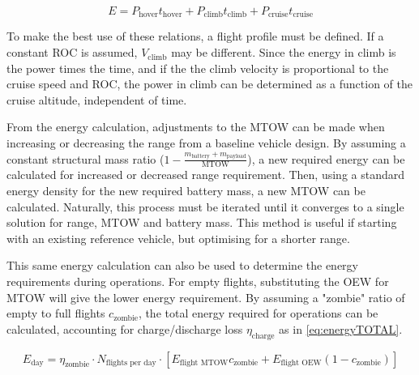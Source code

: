 \begin{equation}
    \label{eq:energy}
    E = P_\text{hover}t_\text{hover} + P_\text{climb}t_\text{climb} + P_\text{cruise}t_\text{cruise}
\end{equation}

To make the best use of these relations, a flight profile must be defined. If a constant ROC is assumed, $V_\text{climb}$ may be different. Since the energy in climb is the power times the time, and if the the climb velocity is proportional to the cruise speed and ROC, the power in climb can be determined as a function of the cruise altitude, independent of time.

From the energy calculation, adjustments to the MTOW can be made when increasing or decreasing the range from a baseline vehicle design. By assuming a constant structural mass ratio ($1-\frac{m_\text{battery}+m_\text{payload}}{\text{MTOW}}$), a new required energy can be calculated for increased or decreased range requirement. Then, using a standard energy density for the new required battery mass, a new MTOW can be calculated. Naturally, this process must be iterated until it converges to a single solution for range, MTOW and battery mass. This method is useful if starting with an existing reference vehicle, but optimising for a shorter range.

This same energy calculation can also be used to determine the energy requirements during operations. For empty flights, substituting the OEW for MTOW will give the lower energy requirement. By assuming a "zombie" ratio of empty to full flights $c_\text{zombie}$, the total energy required for operations can be calculated, accounting for charge/discharge loss $\eta_\text{charge}$ as in \autoref{eq:energyTOTAL}.

\begin{equation}
    \label{eq:energyTOTAL}
    E_\text{day} = \eta_\text{zombie}\cdot N_\text{flights per day} \cdot \left[ E_\text{flight MTOW}c_\text{zombie} + E_\text{flight OEW}(1-c_\text{zombie}) \right]
\end{equation}

